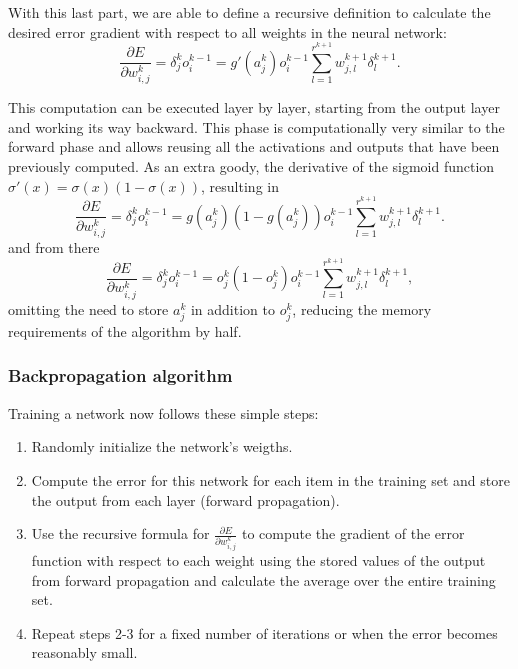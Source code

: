 With this last part, we are able to define a recursive definition to calculate the desired error gradient with respect to all weights in the neural network:
\begin{equation}
\frac{\partial E}{\partial w_{i,j}^k}=\delta_j^ko_i^{k-1}=g'(a_j^k)o_i^{k-1}\sum_{l=1}^{r^{k+1}}w_{j,l}^{k+1}\delta_l^{k+1}.
\end{equation}

This computation can be executed layer by layer, starting from the output layer and working its way backward. This phase is computationally very similar to the forward phase and allows reusing all the activations and outputs that have been previously computed. As an extra goody, the derivative of the sigmoid function $\sigma'(x)=\sigma(x)(1-\sigma(x))$, resulting in
\begin{equation}
\frac{\partial E}{\partial w_{i,j}^k}=\delta_j^ko_i^{k-1}=g(a_j^k)(1-g(a_j^k))o_i^{k-1}\sum_{l=1}^{r^{k+1}}w_{j,l}^{k+1}\delta_l^{k+1}.
\end{equation}
and from there
\begin{equation}
\frac{\partial E}{\partial w_{i,j}^k}=\delta_j^ko_i^{k-1}=o_j^k(1-o_j^k)o_i^{k-1}\sum_{l=1}^{r^{k+1}}w_{j,l}^{k+1}\delta_l^{k+1},
\end{equation}
omitting the need to store $a_j^k$ in addition to $o_j^k$, reducing the memory requirements of the algorithm by half.

\subsubsection{Backpropagation algorithm}

Training a network now follows these simple steps:
\begin{enumerate}
\item Randomly initialize the network's weigths.
\item Compute the error for this network for each item in the training set and store the output from each layer (forward propagation).
\item Use the recursive formula for $\frac{\partial E}{\partial w^k_{i,j}}$ to compute the gradient of the error function with respect to each weight using the stored values of the output from forward propagation and calculate the average over the entire training set.
\item Repeat steps 2-3 for a fixed number of iterations or when the error becomes reasonably small.
\end{enumerate}

